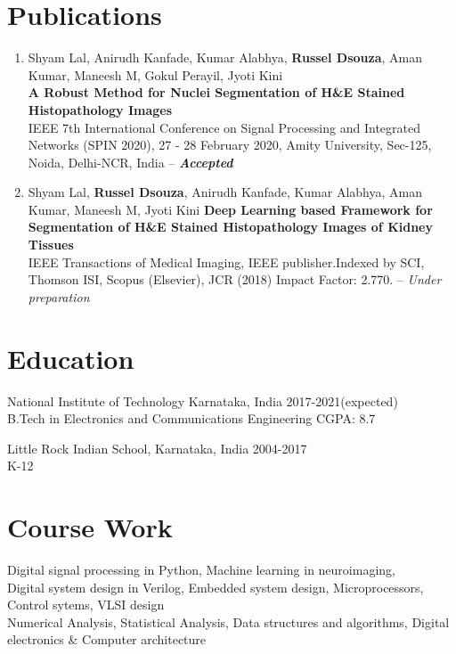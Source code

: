 \documentclass[letterpaper]{article}
\renewenvironment{itemize}{
  \begin{list}{}{
    \setlength{\leftmargin}{1.5em}
  }
}{
  \end{list}
}
\newcommand{\smallGreyFont}[1]{\textcolor{black!80}{\small{#1}}}
\begin{document}
\section*{Publications}
  \begin{enumerate}
    \item Shyam Lal, Anirudh Kanfade, Kumar Alabhya, \textbf{Russel Dsouza}, Aman Kumar, Maneesh M, Gokul Perayil, Jyoti Kini \\
    \textbf{A Robust Method for Nuclei Segmentation of H\&E Stained Histopathology Images}\\
    IEEE 7th International Conference on Signal Processing and Integrated Networks (SPIN 2020), 27 - 28 February 2020, Amity University, Sec-125, Noida, Delhi-NCR, India -- \textit{\textbf{Accepted}}

    \item Shyam Lal, \textbf{Russel Dsouza}, Anirudh Kanfade, Kumar Alabhya, Aman Kumar, Maneesh M, Jyoti Kini
    \textbf{Deep Learning based Framework for Segmentation of H\&E Stained Histopathology Images of Kidney Tissues}\\
    IEEE Transactions of Medical Imaging, IEEE publisher.Indexed by SCI, Thomson ISI, Scopus (Elsevier), JCR (2018) Impact Factor: 2.770. -- \textit{Under preparation}
  \end{enumerate}


\section*{Education}
  \begin{itemize}
    \item National Institute of Technology Karnataka, India\hfill
    \smallGreyFont{2017-2021(expected)}
    \\
    \smallGreyFont{B.Tech in Electronics and Communications Engineering}
    \hfill{\smallGreyFont{CGPA: 8.7}}

    \item Little Rock Indian School, Karnataka, India\hfill
    \smallGreyFont{2004-2017}
    \\
    \smallGreyFont{K-12}
  \end{itemize}


\section*{Course Work}
  \begin{itemize}
    \item  Digital signal processing in Python, Machine learning in neuroimaging, \\
    Digital system design in Verilog, Embedded system design,
    Microprocessors, Control sytems, VLSI design\\
    Numerical Analysis, Statistical Analysis, Data structures and algorithms, Digital electronics \& Computer architecture
  \end{itemize}
\end{document}
